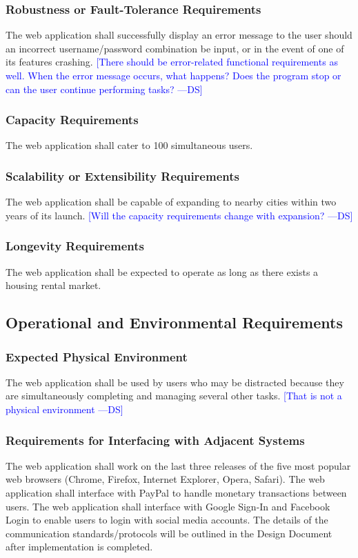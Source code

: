 \documentclass[12pt, titlepage]{article}
\newcommand{\authornote}[3]{\textcolor{#1}{[#3 ---#2]}}
\newcommand{\authornote}[3]{}
\newcommand{\ds}[1]{\authornote{blue}{DS}{#1}}
\begin{document}
{\subsubsection{Robustness or Fault-Tolerance Requirements}
The web application shall successfully display an error message to the user 
should an incorrect username/password combination be input, or in the event of 
one of its features crashing.  
\ds{There should be error-related functional requirements as well. When the
error message occurs, what happens? Does the program stop or can the user 
continue performing tasks?}
\subsubsection{Capacity Requirements}
The web application shall cater to 100 simultaneous users. 

\subsubsection{Scalability or Extensibility Requirements}
The web application shall be capable of expanding to nearby cities within two 
years of its launch.
\ds{Will the capacity requirements change with expansion?}
\subsubsection{Longevity Requirements}
The web application shall be expected to operate as long as there exists a 
housing rental market.
\subsection{Operational and Environmental Requirements}
\subsubsection{Expected Physical Environment}
The web application shall be used by users who may be distracted because they 
are simultaneously completing and managing several other tasks. 
\ds{That is not a physical environment}
\subsubsection{Requirements for Interfacing with Adjacent Systems}
The web application shall work on the last three releases of the five most 
popular web browsers (Chrome, Firefox, Internet Explorer, Opera, Safari). The 
web application shall interface with PayPal to handle monetary transactions 
between users. The web application shall interface with Google Sign-In and 
Facebook Login to enable users to login with social media accounts. The details 
of the communication standards/protocols will be outlined in the Design Document 
after implementation is completed.
}
\end{document}
